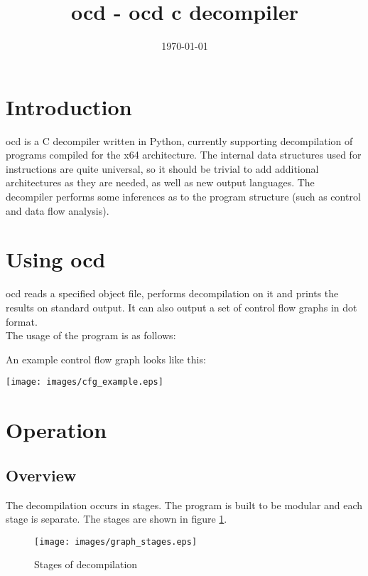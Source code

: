 \documentclass[leqno,11pt]{article}
\title{ocd - ocd c decompiler}
\date{\today}
\begin{document}
\maketitle

\tableofcontents

\newpage

\section{Introduction}

ocd is a C decompiler written in Python, currently supporting decompilation of programs compiled for the x64 architecture. The internal data structures used for instructions are quite universal, so it should be trivial to add additional architectures as they are needed, as well as new output languages. The decompiler performs some inferences as to the program structure (such as control and data flow analysis).

\section{Using ocd}

ocd reads a specified object file, performs decompilation on it and prints the results on standard output. It can also output a set of control flow graphs in dot format. 
\\ The usage of the program is as follows:



An example control flow graph looks like this:

\texttt{[image: images/cfg\_example.eps]}

\section{Operation}

\subsection{Overview}

The decompilation occurs in stages. The program is built to be modular and each stage is separate. The stages are shown in figure \ref{fig:graph_stages}.

\begin{figure}
\texttt{[image: images/graph\_stages.eps]}
\centering
\caption{Stages of decompilation}
\label{fig:graph_stages}
\end{figure}
\end{document}
